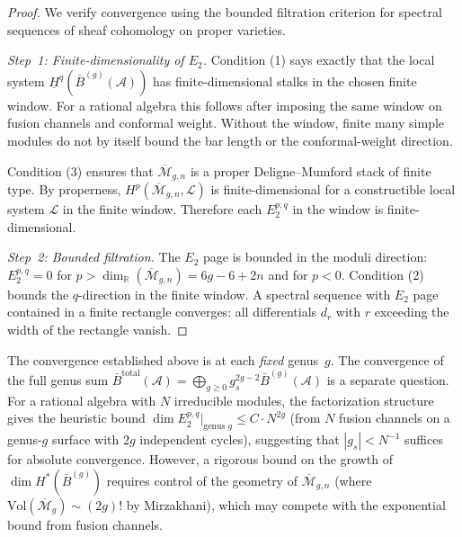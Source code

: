 \begin{proof}
We verify convergence using the bounded filtration criterion for spectral sequences of sheaf cohomology on proper varieties.

\emph{Step~1: Finite-dimensionality of $E_2$.}
Condition (1) says exactly that the local system
$\underline{H}^q(\bar{B}^{(g)}(\mathcal{A}))$ has finite-dimensional
stalks in the chosen finite window. For a rational algebra this follows
after imposing the same window on fusion channels and conformal weight.
Without the window, finite many simple modules do not by itself bound
the bar length or the conformal-weight direction.

Condition (3) ensures that $\overline{\mathcal{M}}_{g,n}$ is a proper
Deligne--Mumford stack of finite type. By properness,
$H^p(\overline{\mathcal{M}}_{g,n}, \mathcal{L})$ is finite-dimensional
for a constructible local system $\mathcal{L}$ in the finite window.
Therefore each $E_2^{p,q}$ in the window is finite-dimensional.

\emph{Step~2: Bounded filtration.}
The $E_2$ page is bounded in the moduli direction:
$E_2^{p,q}=0$ for
$p>\dim_{\mathbb{R}}(\overline{\mathcal{M}}_{g,n})=6g-6+2n$ and for
$p<0$. Condition (2) bounds the $q$-direction in the finite window. A
spectral sequence with $E_2$ page contained in a finite rectangle
converges: all differentials $d_r$ with $r$ exceeding the width of the
rectangle vanish.

\end{proof}

\begin{remark}\label{rem:genus-summation}
The convergence established above is at each \emph{fixed} genus~$g$. The convergence of the full genus sum $\bar{B}^{\mathrm{total}}(\mathcal{A}) = \bigoplus_{g \geq 0} g_s^{2g-2} \bar{B}^{(g)}(\mathcal{A})$ is a separate question. For a rational algebra with $N$ irreducible modules, the factorization structure gives the heuristic bound $\dim E_2^{p,q}|_{\text{genus } g} \leq C \cdot N^{2g}$ (from $N$ fusion channels on a genus-$g$ surface with $2g$ independent cycles), suggesting that $|g_s| < N^{-1}$ suffices for absolute convergence. However, a rigorous bound on the growth of $\dim H^*(\bar{B}^{(g)})$ requires control of the geometry of $\overline{\mathcal{M}}_{g,n}$ (where $\mathrm{Vol}(\overline{\mathcal{M}}_g) \sim (2g)!$ by Mirzakhani), which may compete with the exponential bound from fusion channels.
\end{remark}


